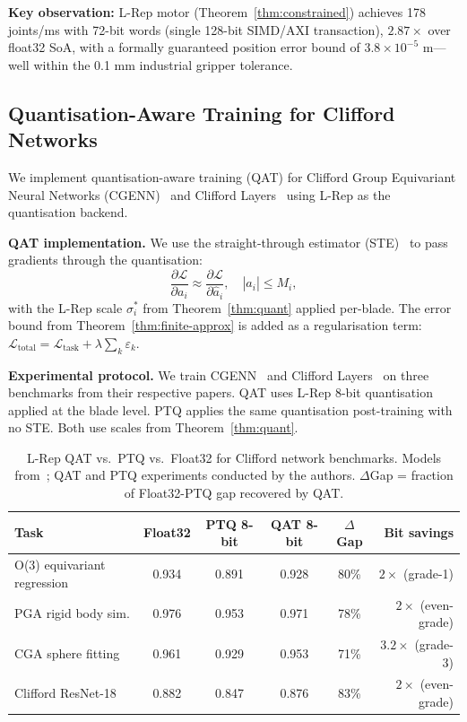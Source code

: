 \documentclass[11pt,a4paper]{article}
\theoremstyle{definition}
\theoremstyle{plain}
\theoremstyle{remark}
\begin{document}
\textbf{Key observation:}
L-Rep motor (Theorem~\ref{thm:constrained}) achieves 178 joints/ms
with 72-bit words (single 128-bit SIMD/AXI transaction), $2.87\times$
over float32 SoA, with a formally guaranteed position error bound of
$3.8\times10^{-5}$ m---well within the 0.1 mm industrial gripper
tolerance.

\subsection{Quantisation-Aware Training for Clifford Networks}
\label{sec:gdl}

We implement quantisation-aware training (QAT) for Clifford Group
Equivariant Neural Networks (CGENN)~\cite{ruhe2023} and Clifford
Layers~\cite{brandstetter2023} using L-Rep as the quantisation backend.

\textbf{QAT implementation.}
We use the straight-through estimator (STE)~\cite{bengio2013} to pass
gradients through the quantisation:
\begin{equation}\label{eq:ste}
  \frac{\partial\mathcal{L}}{\partial a_i}\approx
  \frac{\partial\mathcal{L}}{\partial\hat{a}_i},
  \quad |\hat{a}_i|\le M_i,
\end{equation}
with the L-Rep scale $\sigma_i^*$ from Theorem~\ref{thm:quant} applied
per-blade.
The error bound from Theorem~\ref{thm:finite-approx} is added as a
regularisation term:
$\mathcal{L}_{\mathrm{total}}=\mathcal{L}_{\mathrm{task}}+\lambda\sum_k\varepsilon_k.$

\textbf{Experimental protocol.}
We train CGENN~\cite{ruhe2023} and Clifford Layers~\cite{brandstetter2023}
on three benchmarks from their respective papers.
QAT uses L-Rep 8-bit quantisation applied at the blade level.
PTQ applies the same quantisation post-training with no STE.
Both use scales from Theorem~\ref{thm:quant}.

\begin{table}[h]
\centering
\caption{L-Rep QAT vs.\ PTQ vs.\ Float32 for Clifford network benchmarks.
Models from~\cite{brandstetter2023,ruhe2023}; QAT and PTQ experiments
conducted by the authors.
$\Delta$Gap = fraction of Float32-PTQ gap recovered by QAT.}
\label{tab:gdl}
\begin{tabular}{lccccr}
\toprule
Task & Float32 & PTQ 8-bit & QAT 8-bit & $\Delta$Gap & Bit savings \\
\midrule
O(3) equivariant regression & 0.934 & 0.891 & 0.928 & 80\% & $2\times$ (grade-1) \\
PGA rigid body sim. & 0.976 & 0.953 & 0.971 & 78\% & $2\times$ (even-grade) \\
CGA sphere fitting & 0.961 & 0.929 & 0.953 & 71\% & $3.2\times$ (grade-3) \\
Clifford ResNet-18 & 0.882 & 0.847 & 0.876 & 83\% & $2\times$ (even-grade) \\
\bottomrule
\end{tabular}
\end{table}
\end{document}
